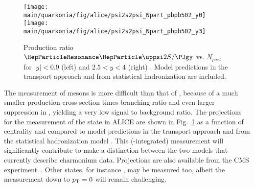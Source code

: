 \documentclass[../report.tex]{subfiles}
\providecommand{\main}{..}
\begin{document}
\begin{figure}[h]
\begin{center}
 \texttt{[image: \\main/quarkonia/fig/alice/psi2s2psi\_Npart\_pbpb502\_y0]}
 \texttt{[image: \\main/quarkonia/fig/alice/psi2s2psi\_Npart\_pbpb502\_y3]}
\end{center}
 \caption{Production ratio $\PGyP{2S}/\PJgy$ vs. $N_{part}$ for $|y|<0.9$ (left) and $2.5<y<4$ (right) \cite{Abelevetal:2014cna,CERN-LHCC-2013-014}. Model predictions in the transport approach \cite{Du:2015wha}  and from statistical hadronization \cite{Andronic:2017pug} are included.}
\label{FigQ:psi2SPbPb}
\end{figure}

The measurement of  mesons is more difficult than that of \PJgy, because of a much smaller production cross section times branching ratio and even larger suppression in \PbPb, yielding a very low signal to background ratio.
The projections for the measurement of the  state in ALICE are shown in Fig.~\ref{FigQ:psi2SPbPb} as a function of centrality and compared to model predictions in the transport approach \cite{Du:2015wha}  and from the statistical hadronization model \cite{Andronic:2017pug}. This (\pT-integrated) measurement will significantly contribute to make a distinction between the two models that currently describe charmonium data. Projections are also available from the CMS experiment~\cite{CMS-PAS-FTR-17-002}.
Other states, for instance \PGcc, may be measured too, albeit the measurement down to $p\sb{\scriptstyle\mathrm{T}}=0$ will remain challenging.


\end{document}
